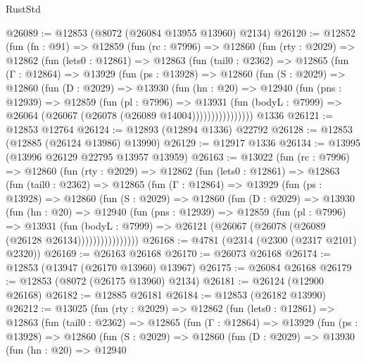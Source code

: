 \begin{lexlean}{RustStd}
\begin{coremodule}
@26089 := @12853 (@8072 (@26084 @13955 @13960) @2134)
@26120 := @12852
    (fun (fn : @91) =>
    @12859
      (fun (rc : @7996) =>
      @12860
        (fun (rty : @2029) =>
        @12862
          (fun (lets0 : @12861) =>
          @12863
            (fun (tail0 : @2362) =>
            @12865
              (fun (Γ : @12864) =>
              @13929
                (fun (ps : @13928) =>
                @12860
                  (fun (S : @2029) =>
                  @12860
                    (fun (D : @2029) =>
                    @13930
                      (fun (hn : @20) =>
                      @12940
                        (fun (pns : @12939) =>
                        @12859
                          (fun (pl : @7996) =>
                          @13931
                            (fun (bodyL : @7999) =>
                            @26064 (@26067 (@26078 (@26089 @14004))))))))))))))))
    @1336
@26121 := @12853 @12764
@26124 := @12893 (@12894 @1336) @22792
@26128 := @12853 (@12885 (@26124 @13986) @13990)
@26129 := @12917 @1336
@26134 := @13995 (@13996 @26129 @22795 @13957 @13959)
@26163 := @13022
    (fun (rc : @7996) =>
    @12860
      (fun (rty : @2029) =>
      @12862
        (fun (lets0 : @12861) =>
        @12863
          (fun (tail0 : @2362) =>
          @12865
            (fun (Γ : @12864) =>
            @13929
              (fun (ps : @13928) =>
              @12860
                (fun (S : @2029) =>
                @12860
                  (fun (D : @2029) =>
                  @13930
                    (fun (hn : @20) =>
                    @12940
                      (fun (pns : @12939) =>
                      @12859
                        (fun (pl : @7996) =>
                        @13931
                          (fun (bodyL : @7999) =>
                          @26121 (@26067 (@26078 (@26089 (@26128 @26134))))))))))))))))
@26168 := @4781 (@2314 (@2300 (@2317 @2101) @2320))
@26169 := @26163 @26168
@26170 := @26073 @26168
@26174 := @12853 (@13947 (@26170 @13960) @13967)
@26175 := @26084 @26168
@26179 := @12853 (@8072 (@26175 @13960) @2134)
@26181 := @26124 (@12900 @26168)
@26182 := @12885 @26181
@26184 := @12853 (@26182 @13990)
@26212 := @13025
    (fun (rty : @2029) =>
    @12862
      (fun (lets0 : @12861) =>
      @12863
        (fun (tail0 : @2362) =>
        @12865
          (fun (Γ : @12864) =>
          @13929
            (fun (ps : @13928) =>
            @12860
              (fun (S : @2029) =>
              @12860
                (fun (D : @2029) =>
                @13930
                  (fun (hn : @20) =>
                  @12940

\end{coremodule}
\end{lexlean}
